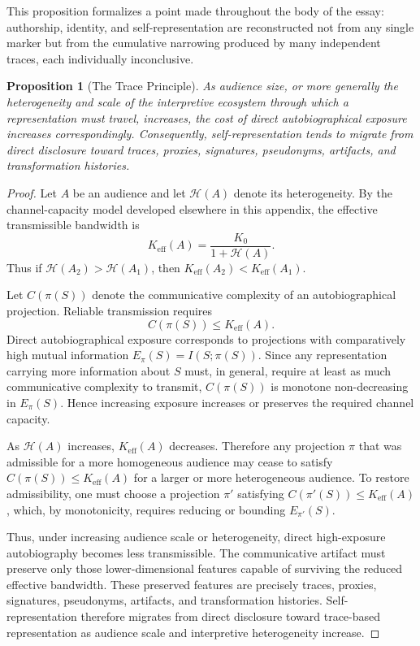 \documentclass[11pt]{article}
\theoremstyle{plain}
\newtheorem{proposition}{Proposition}[section]
\begin{document}
This proposition formalizes a point made throughout the body of the essay: authorship, identity, and self-representation are reconstructed not from any single marker but from the cumulative narrowing produced by many independent traces, each individually inconclusive.

\begin{proposition}[The Trace Principle]
As audience size, or more generally the heterogeneity and scale of the interpretive ecosystem through which a representation must travel, increases, the cost of direct autobiographical exposure increases correspondingly. Consequently, self-representation tends to migrate from direct disclosure toward traces, proxies, signatures, pseudonyms, artifacts, and transformation histories.
\end{proposition}
\begin{proof}
Let $A$ be an audience and let $\mathcal{H}(A)$ denote its heterogeneity. By the channel-capacity model developed elsewhere in this appendix, the effective transmissible bandwidth is
\[
K_{\mathrm{eff}}(A) = \frac{K_0}{1+\mathcal{H}(A)}.
\]
Thus if $\mathcal{H}(A_2) > \mathcal{H}(A_1)$, then $K_{\mathrm{eff}}(A_2) < K_{\mathrm{eff}}(A_1)$.

Let $C(\pi(S))$ denote the communicative complexity of an autobiographical projection. Reliable transmission requires
\[
C(\pi(S)) \leq K_{\mathrm{eff}}(A).
\]
Direct autobiographical exposure corresponds to projections with comparatively high mutual information $E_\pi(S) = I(S;\pi(S))$. Since any representation carrying more information about $S$ must, in general, require at least as much communicative complexity to transmit, $C(\pi(S))$ is monotone non-decreasing in $E_\pi(S)$. Hence increasing exposure increases or preserves the required channel capacity.

As $\mathcal{H}(A)$ increases, $K_{\mathrm{eff}}(A)$ decreases. Therefore any projection $\pi$ that was admissible for a more homogeneous audience may cease to satisfy $C(\pi(S)) \leq K_{\mathrm{eff}}(A)$ for a larger or more heterogeneous audience. To restore admissibility, one must choose a projection $\pi'$ satisfying $C(\pi'(S)) \leq K_{\mathrm{eff}}(A)$, which, by monotonicity, requires reducing or bounding $E_{\pi'}(S)$.

Thus, under increasing audience scale or heterogeneity, direct high-exposure autobiography becomes less transmissible. The communicative artifact must preserve only those lower-dimensional features capable of surviving the reduced effective bandwidth. These preserved features are precisely traces, proxies, signatures, pseudonyms, artifacts, and transformation histories. Self-representation therefore migrates from direct disclosure toward trace-based representation as audience scale and interpretive heterogeneity increase.
\end{proof}
\end{document}
